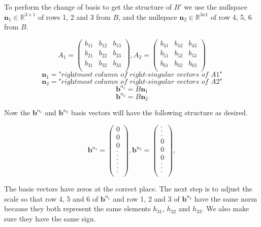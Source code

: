 To perform the change of basis to get the structure of $B'$ we use the nullspace $\textbf{n}_1 \in \mathbb{R}^{3\times 1}$ of rows 1, 2 and 3 from $B$, and the nullspace $\textbf{n}_2 \in \mathbb{R}^{3x1}$ of row 4, 5, 6 from $B$.

\[
A_1 = 
\begin{pmatrix}
b_{11} & b_{12} & b_{13} \\
b_{21} & b_{22} & b_{23} \\
b_{31} & b_{32} & b_{33} \\
\end{pmatrix},
A_2 = 
\begin{pmatrix}
b_{41} & b_{42} & b_{43} \\
b_{51} & b_{52} & b_{53} \\
b_{61} & b_{62} & b_{63} \\
\end{pmatrix}
\]
\[
\textbf{n}_1 = \textit{"rightmost column of right-singular vectors of A1"}
\]
\[
\textbf{n}_2 = \textit{"rightmost column of right-singular vectors of A2"}
\]
\[
\textbf{b}^{n_1} = B\textbf{n}_1
\]
\[
\textbf{b}^{n_2} = B\textbf{n}_2
\]

Now the $\textbf{b}^{n_1}$ and $\textbf{b}^{n_2}$ basis vectors will have the following structure as desired.

\[
\textbf{b}^{n_1} =
\begin{pmatrix}
0 \\
0 \\
0 \\
. \\
. \\
. \\
. \\
. \\
. \\
\end{pmatrix},
\textbf{b}^{n_2} =
\begin{pmatrix}
. \\
. \\
. \\
0 \\
0 \\
0 \\
. \\
. \\
. \\
\end{pmatrix},
\]

The basis vectors have zeros at the correct place. The next step is to adjust the scale so that row 4, 5 and 6 of $\textbf{b}^{n_1}$ and row 1, 2 and 3 of $\textbf{b}^{n_2}$ have the same norm because they both represent the same elements $h_{31}$, $h_{32}$ and $h_{33}$. We also make sure they have the same sign.

